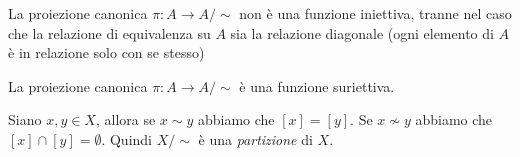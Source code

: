             \begin{corollary}
                La proiezione canonica $\pi : A \rightarrow A/\sim$ non è una funzione iniettiva, tranne nel caso che la relazione di equivalenza su $A$ sia la relazione diagonale (ogni elemento di $A$ è in relazione solo con se stesso)
            \end{corollary}
            \begin{corollary}
                La proiezione canonica $\pi : A \rightarrow A/\sim$ è una funzione suriettiva.
            \end{corollary}
            \begin{property}
                Siano $x,y \in X$, allora se $x \sim y$ abbiamo che $[x] = [y]$. Se $x \nsim y$ abbiamo che $[x] \cap [y] = \emptyset$. Quindi $X/\sim$ è una \emph{partizione} di $X$. 
            \end{property}
